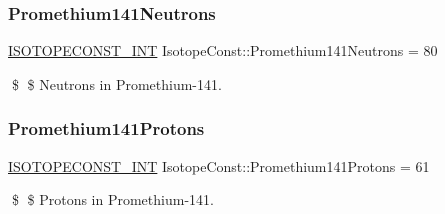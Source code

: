 \subsubsection{\texorpdfstring{Promethium141\+Neutrons}{Promethium141Neutrons}}
{\footnotesize\ttfamily \mbox{\hyperlink{group___isotope_const-_macros_ga5f18360b3e99483a35c32d789e62621c}{I\+S\+O\+T\+O\+P\+E\+C\+O\+N\+S\+T\+\_\+\+I\+NT}} Isotope\+Const\+::\+Promethium141\+Neutrons = 80}

\$ \$ Neutrons in Promethium-\/141. \mbox{\label{group___isotope_const-_promethium-_pm141_ga9ff01714a0fdb81a8819e7fe5ac2afec}} 
\subsubsection{\texorpdfstring{Promethium141\+Protons}{Promethium141Protons}}
{\footnotesize\ttfamily \mbox{\hyperlink{group___isotope_const-_macros_ga5f18360b3e99483a35c32d789e62621c}{I\+S\+O\+T\+O\+P\+E\+C\+O\+N\+S\+T\+\_\+\+I\+NT}} Isotope\+Const\+::\+Promethium141\+Protons = 61}

\$ \$ Protons in Promethium-\/141. 
